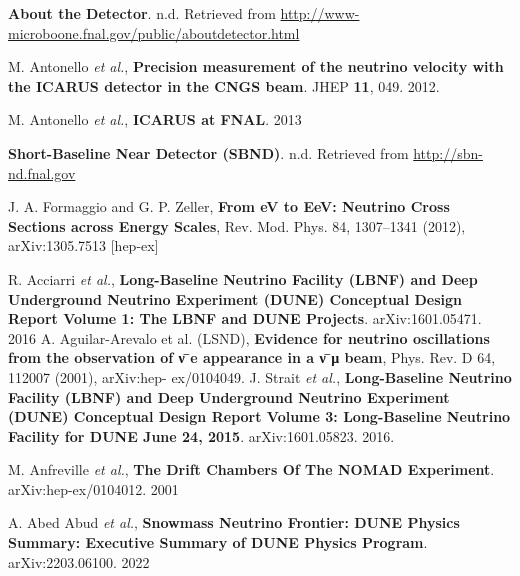 

 \textbf{About the Detector}. n.d. Retrieved from \href{http://www-microboone.fnal.gov/public/aboutdetector.html}{http://www-microboone.fnal.gov/public/aboutdetector.html}

 M. Antonello \textit{et al.}, \textbf{Precision measurement of the neutrino velocity with the ICARUS detector in the CNGS beam}. JHEP \textbf{11}, 049. 2012.

 M. Antonello \textit{et al.}, \textbf{ICARUS at FNAL}. 2013

 \textbf{Short-Baseline Near Detector (SBND)}. n.d. Retrieved from \href{http://sbn-nd.fnal.gov}{http://sbn-nd.fnal.gov}

 J. A. Formaggio and G. P. Zeller, \textbf{From eV to EeV: Neutrino Cross Sections across Energy Scales}, Rev. Mod. Phys. 84, 1307–1341 (2012), arXiv:1305.7513 [hep-ex]

 R. Acciarri \textit{et al.}, \textbf{Long-Baseline Neutrino Facility (LBNF) and Deep Underground Neutrino Experiment (DUNE) Conceptual Design Report Volume 1: The LBNF and DUNE Projects}. 	arXiv:1601.05471. 2016 
 A. Aguilar-Arevalo et al. (LSND), \textbf{Evidence for neutrino oscillations from the observation of ν ̄e appearance in a ν ̄μ beam}, Phys. Rev. D 64, 112007 (2001), arXiv:hep- ex/0104049.
 J. Strait \textit{et al.}, \textbf{Long-Baseline Neutrino Facility (LBNF) and Deep Underground Neutrino Experiment (DUNE) Conceptual Design Report Volume 3: Long-Baseline Neutrino Facility for DUNE June 24, 2015}. arXiv:1601.05823. 2016.

 M. Anfreville \textit{et al.}, \textbf{The Drift Chambers Of The NOMAD Experiment}. 	arXiv:hep-ex/0104012. 2001

 A. Abed Abud \textit{et al.}, \textbf{Snowmass Neutrino Frontier: DUNE Physics Summary: Executive Summary of DUNE Physics Program}. arXiv:2203.06100. 2022








